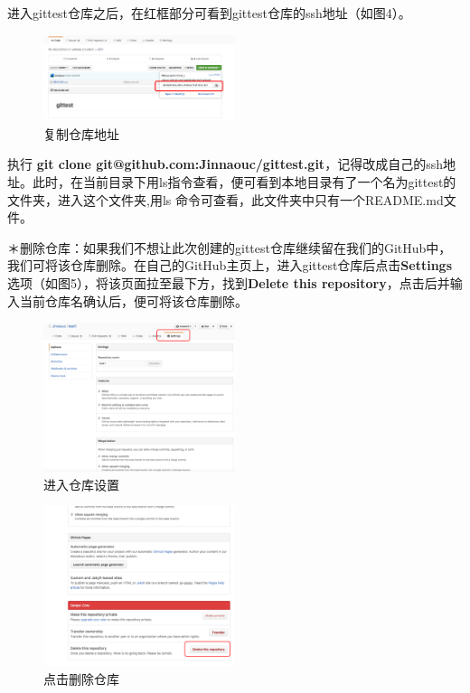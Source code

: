 \documentclass{article}
\begin{document}
进入gittest仓库之后，在红框部分可看到gittest仓库的ssh地址（如图4）。

\begin{figure}[!htb] %
\centering \includegraphics[width=0.5\textwidth]{fig4.png} \caption{复制仓库地址}
\label{fig:1}
\end{figure}

执行 \textbf{git clone git@github.com:Jinnaouc/gittest.git}，记得改成自己的ssh地址。此时，在当前目录下用ls指令查看，便可看到本地目录有了一个名为gittest的文件夹，进入这个文件夹,用ls 命令可查看，此文件夹中只有一个README.md文件。

＊删除仓库：如果我们不想让此次创建的gittest仓库继续留在我们的GitHub中，我们可将该仓库删除。在自己的GitHub主页上，进入gittest仓库后点击\textbf{Settings}选项（如图5），将该页面拉至最下方，找到\textbf{Delete this repository}，点击后并输入当前仓库名确认后，便可将该仓库删除。

 \begin{figure}[!htb] %
\centering \includegraphics[width=0.5\textwidth]{fig5.png} \caption{进入仓库设置}
\label{fig:1}
\end{figure}

\begin{figure}[!htb] %
\centering \includegraphics[width=0.5\textwidth]{fig6.png} \caption{点击删除仓库}
\label{fig:1}
\end{figure}
\end{document}
